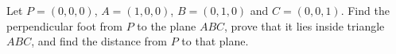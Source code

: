 Let $P=(0,0,0)$, $A=(1,0,0)$, $B=(0,1,0)$ and $C=(0,0,1)$. Find the perpendicular foot from $P$ to the plane $ABC$, prove that it lies inside triangle $ABC$, and find the distance from $P$ to that plane.
